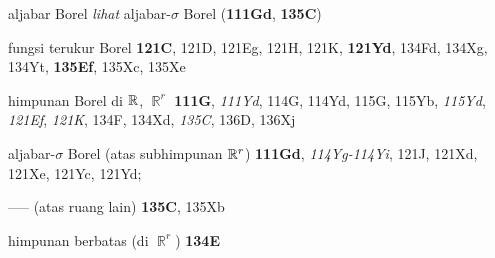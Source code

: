 aljabar Borel {\it lihat} aljabar-$\sigma$ Borel ({\bf 111Gd},
{\bf 135C}) 























fungsi terukur Borel {\bf 121C}, 121D, 121Eg, 121H, 121K, {\bf 121Yd}, 134Fd, 134Xg, 134Yt,
{\bf 135Ef}, 135Xc, 135Xe







himpunan Borel di $\Bbb R$, $\BbbR^r$ {\bf 111G}, {\it 111Yd}, 114G, 114Yd,
115G, 115Yb, {\it 115Yd}, {\it 121Ef}, {\it 121K}, 134F, 134Xd,
{\it 135C}, 136D, 136Xj






aljabar-$\sigma$ Borel (atas subhimpunan $\Bbb R^r$) {\bf 111Gd},
{\it 114Yg-114Yi}, 
121J, 121Xd, 121Xe, 121Yc, 121Yd;

----- (atas ruang lain) {\bf 135C}, 135Xb











himpunan berbatas (di $\BbbR^r$) {\bf 134E}




















































